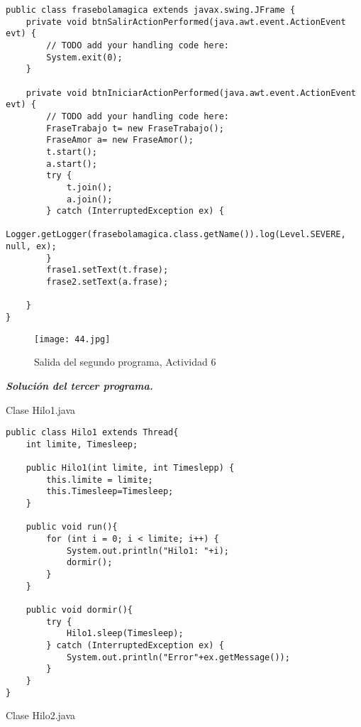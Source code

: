\begin{verbatim}
public class frasebolamagica extends javax.swing.JFrame {
    private void btnSalirActionPerformed(java.awt.event.ActionEvent evt) {                                         
        // TODO add your handling code here:
        System.exit(0);
    }                                        

    private void btnIniciarActionPerformed(java.awt.event.ActionEvent evt) {                                           
        // TODO add your handling code here:
        FraseTrabajo t= new FraseTrabajo();
        FraseAmor a= new FraseAmor();
        t.start();
        a.start();
        try {
            t.join();
            a.join();
        } catch (InterruptedException ex) {
            Logger.getLogger(frasebolamagica.class.getName()).log(Level.SEVERE, null, ex);
        }
        frase1.setText(t.frase);
        frase2.setText(a.frase);
        
    }
}
\end{verbatim} 
\begin{figure}[h!]
		\centering
		{\texttt{[image: 44.jpg]}\par} 
		\caption{Salida del segundo programa, Actividad 6}\vspace{1cm}
\end{figure}

\textbf{\textit{Solución del tercer programa.}}

\begin{center}
Clase Hilo1.java
\end{center}

\begin{verbatim}
public class Hilo1 extends Thread{
    int limite, Timesleep;

    public Hilo1(int limite, int Timeslepp) {
        this.limite = limite;
        this.Timesleep=Timesleep;
    }
    
    public void run(){
        for (int i = 0; i < limite; i++) {
            System.out.println("Hilo1: "+i);
            dormir();
        }
    }
    
    public void dormir(){
        try {
            Hilo1.sleep(Timesleep);
        } catch (InterruptedException ex) {
            System.out.println("Error"+ex.getMessage());
        }
    }
}
\end{verbatim} \vspace{1cm}

\begin{center}
Clase Hilo2.java
\end{center}

